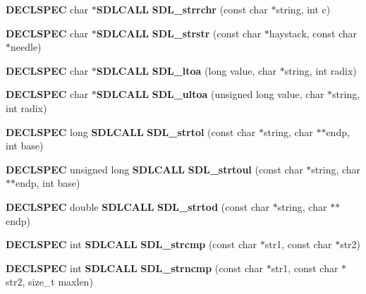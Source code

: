 \begin{DoxyCompactItemize}
\item 
{\bf D\+E\+C\+L\+S\+P\+E\+C} char $\ast${\bf S\+D\+L\+C\+A\+L\+L} {\bfseries S\+D\+L\+\_\+strrchr} (const char $\ast$string, int c)\label{_s_d_l__stdinc_8h_a6bb4c69dfa7853fc24921f1ea9e2283e}

\item 
{\bf D\+E\+C\+L\+S\+P\+E\+C} char $\ast${\bf S\+D\+L\+C\+A\+L\+L} {\bfseries S\+D\+L\+\_\+strstr} (const char $\ast$haystack, const char $\ast$needle)\label{_s_d_l__stdinc_8h_aa50eca29c8736f5be661e5b26b718cb1}

\item 
{\bf D\+E\+C\+L\+S\+P\+E\+C} char $\ast${\bf S\+D\+L\+C\+A\+L\+L} {\bfseries S\+D\+L\+\_\+ltoa} (long value, char $\ast$string, int radix)\label{_s_d_l__stdinc_8h_a847476472a4e0c6ab1dee0dffdd9fc39}

\item 
{\bf D\+E\+C\+L\+S\+P\+E\+C} char $\ast${\bf S\+D\+L\+C\+A\+L\+L} {\bfseries S\+D\+L\+\_\+ultoa} (unsigned long value, char $\ast$string, int radix)\label{_s_d_l__stdinc_8h_ae9e90fd3fbff283bdcfed075a17d86e0}

\item 
{\bf D\+E\+C\+L\+S\+P\+E\+C} long {\bf S\+D\+L\+C\+A\+L\+L} {\bfseries S\+D\+L\+\_\+strtol} (const char $\ast$string, char $\ast$$\ast$endp, int base)\label{_s_d_l__stdinc_8h_a1ba7b50ded3403c597816c187617f874}

\item 
{\bf D\+E\+C\+L\+S\+P\+E\+C} unsigned long {\bf S\+D\+L\+C\+A\+L\+L} {\bfseries S\+D\+L\+\_\+strtoul} (const char $\ast$string, char $\ast$$\ast$endp, int base)\label{_s_d_l__stdinc_8h_a4a01eceae2509ade7deb4252d00a0204}

\item 
{\bf D\+E\+C\+L\+S\+P\+E\+C} double {\bf S\+D\+L\+C\+A\+L\+L} {\bfseries S\+D\+L\+\_\+strtod} (const char $\ast$string, char $\ast$$\ast$endp)\label{_s_d_l__stdinc_8h_a7a98e3ed3836cba9cd1337c869e4e13c}

\item 
{\bf D\+E\+C\+L\+S\+P\+E\+C} int {\bf S\+D\+L\+C\+A\+L\+L} {\bfseries S\+D\+L\+\_\+strcmp} (const char $\ast$str1, const char $\ast$str2)\label{_s_d_l__stdinc_8h_a37e18b9103f755d03cf4b0aedeb39fb8}

\item 
{\bf D\+E\+C\+L\+S\+P\+E\+C} int {\bf S\+D\+L\+C\+A\+L\+L} {\bfseries S\+D\+L\+\_\+strncmp} (const char $\ast$str1, const char $\ast$str2, size\+\_\+t maxlen)\label{_s_d_l__stdinc_8h_a21287cfa7609bbc3d46ea10b20234389}


\end{DoxyCompactItemize}
